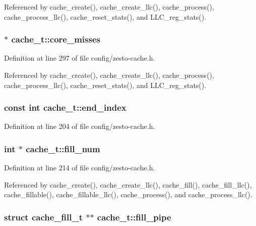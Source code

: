 Referenced by cache\_\-create(), cache\_\-create\_\-llc(), cache\_\-process(), cache\_\-process\_\-llc(), cache\_\-reset\_\-stats(), and LLC\_\-reg\_\-stats().
\subsubsection[{core\_\-misses}]{$\ast$ {\bf cache\_\-t::core\_\-misses}}\label{structcache__t_4b3d5c1a16b76994887fba22af90c26e}




Definition at line 297 of file config/zesto-cache.h.

Referenced by cache\_\-create(), cache\_\-create\_\-llc(), cache\_\-process(), cache\_\-process\_\-llc(), cache\_\-reset\_\-stats(), and LLC\_\-reg\_\-stats().
\subsubsection[{end\_\-index}]{\setlength{\rightskip}{0pt plus 5cm}const int {\bf cache\_\-t::end\_\-index}}\label{structcache__t_2eb787496b20a0dde95b0d3961f26a48}




Definition at line 204 of file config/zesto-cache.h.
\subsubsection[{fill\_\-num}]{\setlength{\rightskip}{0pt plus 5cm}int $\ast$ {\bf cache\_\-t::fill\_\-num}}\label{structcache__t_a2093b0fa3c3d7739aad041cf3f0019b}




Definition at line 214 of file config/zesto-cache.h.

Referenced by cache\_\-create(), cache\_\-create\_\-llc(), cache\_\-fill(), cache\_\-fill\_\-llc(), cache\_\-fillable(), cache\_\-fillable\_\-llc(), cache\_\-process(), and cache\_\-process\_\-llc().
\subsubsection[{fill\_\-pipe}]{\setlength{\rightskip}{0pt plus 5cm}struct {\bf cache\_\-fill\_\-t} $\ast$$\ast$ {\bf cache\_\-t::fill\_\-pipe}\hspace{0.3cm}{\tt  [read]}}\label{structcache__t_27ef735eb43c110b6a0d803b3c6dbdce}




